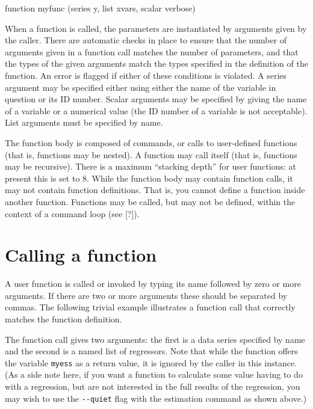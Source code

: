 \begin{code}
      function myfunc (series y, list xvars, scalar verbose)
\end{code}

When a function is called, the parameters are instantiated by
arguments given by the caller.  There are automatic checks in place to
ensure that the number of arguments given in a function call matches
the number of parameters, and that the types of the given arguments
match the types specified in the definition of the function.  An error
is flagged if either of these conditions is violated.  A series
argument may be specified either using either the name of the variable
in question or its ID number.  Scalar arguments may be specified by
giving the name of a variable or a numerical value (the ID number of a
variable is not acceptable).  List arguments must be specified by
name.
    
The function body is composed of  commands, or calls to
user-defined functions (that is, functions may be nested).  A function
may call itself (that is, functions may be recursive). There is a
maximum ``stacking depth'' for user functions: at present this is set
to 8.  While the function body may contain function calls, it may not
contain function definitions.  That is, you cannot define a function
inside another function.  Functions may be called, but may not be
defined, within the context of a command loop (see [?]).
    

\section{Calling a function}
\label{func-call}

A user function is called or invoked by typing its name followed by
zero or more arguments.  If there are two or more arguments these
should be separated by commas.  The following trivial example
illustrates a function call that correctly matches the function
definition.
    

The function call gives two arguments: the first is a data series
specified by name and the second is a named list of regressors.  Note
that while the function offers the variable \verb+myess+ as a return
value, it is ignored by the caller in this instance.  (As a side note
here, if you want a function to calculate some value having to do with
a regression, but are not interested in the full results of the
regression, you may wish to use the \verb+--quiet+ flag with the
estimation command as shown above.)
    

